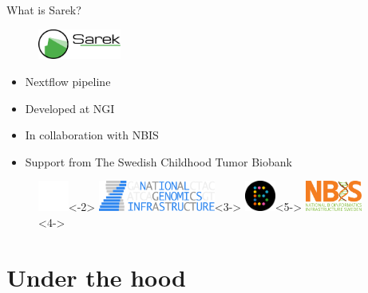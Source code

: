 \documentclass[usepdftitle=false]{beamer}
\begin{document}
\begin{frame}{What is Sarek?}
	\begin{figure}
		\includegraphics[height=1cm]{pictures/Sarek_no_border}
	\end{figure}
	\begin{itemize}
		\pause
		\item Nextflow pipeline
		\item<3-> Developed at NGI
		\item<4-> In collaboration with NBIS
		\item<5-> Support from The Swedish Childhood Tumor Biobank
	\end{itemize}
	\begin{figure}
		\includegraphics[height=1cm]{pictures/blank}<-2>
		\includegraphics[height=1cm]{pictures/NGI}<3->
		\only<3->{\hfill}
		\includegraphics[height=1cm]{pictures/Barntumorbanken}<5->
		\only<4->{\hfill}
		\includegraphics[height=1cm]{pictures/NBIS}<4->
	\end{figure}
	\vfill
\end{frame}

\section{Under the hood}
\end{document}
